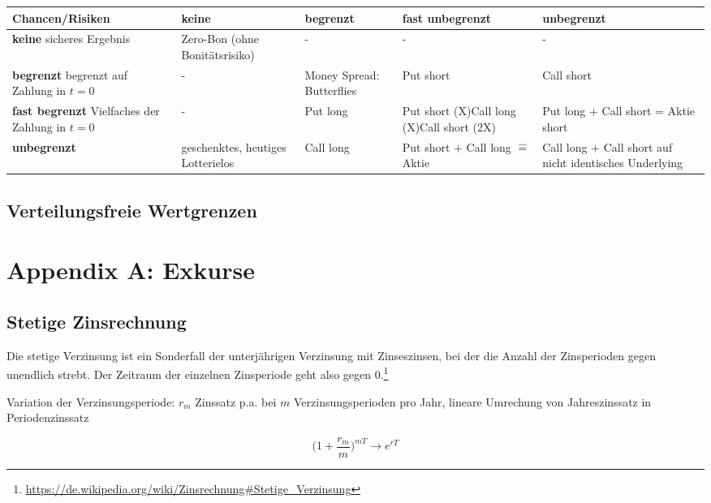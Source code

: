 \begin{tabularx}{\columnwidth}{|X|X|X|X|X|}
	\hline
	\textbf{Chancen/Risiken} & \textbf{keine} & \textbf{begrenzt} & \textbf{fast unbegrenzt} & \textbf{unbegrenzt} \\
	\hline
	\textbf{keine} \newline sicheres Ergebnis & Zero-Bon (ohne Bonitätsrisiko) & - & - & - \\
	\hline
	\textbf{begrenzt} \newline begrenzt auf Zahlung in \(t=0\) & - & Money Spread: Butterflies & Put short & Call short \\
	\hline
	\textbf{fast begrenzt} \newline Vielfaches der Zahlung in \(t=0\) & - & Put long & Put short (X)\newline Call long (X)\newline Call short (2X) & Put long + Call short = Aktie short \\
	\hline
	\textbf{unbegrenzt} & geschenktes, heutiges Lotterielos & Call long & Put short + Call long \(\hat{=}\) Aktie & Call long + Call short auf nicht identisches Underlying \\
	\hline
\end{tabularx}


\subsection{Verteilungsfreie Wertgrenzen}



\section{Appendix A: Exkurse}

\subsection{Stetige Zinsrechnung}

Die stetige Verzinsung ist ein Sonderfall der unterjährigen Verzinsung mit Zinseszinsen, bei der die Anzahl der Zinsperioden gegen unendlich strebt. Der Zeitraum der einzelnen Zinsperiode geht also gegen \(0\).\footnote{\url{https://de.wikipedia.org/wiki/Zinsrechnung\#Stetige_Verzinsung}}

Variation der Verzinsungsperiode: \(r_m\) Zinssatz p.a. bei \(m\) Verzinsungsperioden pro Jahr, lineare Umrechung von Jahreszinssatz in Periodenzinssatz

\[\Big(1+\frac{r_m}{m}\Big)^{mT} \longrightarrow e^{rT}\]


